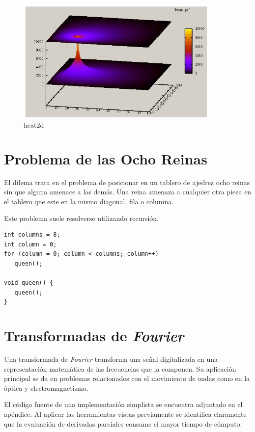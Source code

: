 \documentclass[a4paper]{report}
\begin{document}
\begin{figure}[H]
\begin{center}
\includegraphics[width=10cm]{heat2d.png}
\caption{heat2d}
\end{center}
\end{figure}

\section{Problema de las Ocho Reinas}

El dilema trata en el problema de posicionar en un tablero de ajedrez ocho
reinas sin que alguna amenace a las dem\'as. Una reina amenaza a cualquier otra
pieza en el tablero que este en la mismo diagonal, fila o columna.

\bigskip

Este problema suele resolverse utilizando recursi\'on.

\begin{verbatim}
int columns = 8;
int column = 0;
for (column = 0; column < columns; column++)
   queen();

void queen() {
   queen();
}
\end{verbatim}

\section{Transformadas de {\it Fourier}}

Una transformada de {\it Fourier} \cite{fourier} transforma una se\~nal
digitalizada en una representaci\'on matem\'atica de las frecuencias que la
componen. Su aplicaci\'on principal se da en problemas relacionados con el
movimiento de ondas como en la \'optica y electromagnetismo.

\bigskip

El c\'odigo fuente de una implementaci\'on simplista se encuentra adjuntado en
el ap\'endice. Al aplicar las herramientas vistas previamente se identifica
claramente que la evaluaci\'on de derivadas parciales consume el mayor tiempo
de c\'omputo.
\end{document}
